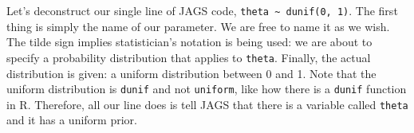 Let's deconstruct our single line of JAGS code, {\tt theta \~{ } dunif(0, 1)}. The
first thing is simply the name of our parameter. We are free to name it as we
wish. The tilde sign implies statistician's notation is being used: we are
about to specify a probability distribution that applies to {\tt theta}. Finally,
the actual distribution is given: a uniform distribution between 0 and 1. Note
that the uniform distribution is {\tt dunif} and not {\tt uniform}, like how
there is a {\tt dunif} function in R. Therefore, all our line does is tell JAGS
that there is a variable called {\tt theta} and it has a uniform prior.




